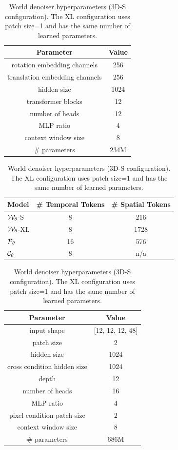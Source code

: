 \begin{subappendices}
\begin{table}[htbp]
\begin{minipage}[t]{0.48\textwidth}
\vspace{0.8em}

\caption{Camera model configuration.}
\label{c4:table:cam-model}
\begin{tabular}{cc}\toprule
Parameter & Value \\
\midrule
rotation embedding channels & 256 \\
translation embedding channels & 256 \\
hidden size & 1024 \\
transformer blocks & 12 \\
number of heads & 12 \\
MLP ratio & 4 \\
context window size & 8 \\
\# parameters & 234M \\
\bottomrule
\end{tabular}

\vspace{0.8em}

\caption{Number of spatial and temporal tokens for different models.}
\label{c4:table:tokens}
\begin{tabular}{lcc}
\toprule
Model & \# Temporal Tokens & \# Spatial Tokens \\
\midrule
${\mathcal{W}}_\theta$-S & 8 & 216 \\
${\mathcal{W}}_\theta$-XL & 8 & 1728 \\
${\mathcal{P}}_\theta$ & 16 & 576 \\
${\mathcal{C}}_\theta$ & 8 & n/a \\
\bottomrule
\end{tabular}

\end{minipage}
\hfill
\begin{minipage}[t]{0.48\textwidth}
\centering

\caption{World denoiser hyperparameters (3D-S configuration). The XL configuration uses patch size=1 and has the same number of learned parameters.}
\label{c4:table:world-denoiser}
\begin{tabular}{cc}\toprule
Parameter & Value \\
\midrule
input shape & [12, 12, 12, 48] \\
patch size & 2 \\
hidden size & 1024 \\
cross condition hidden size & 1024 \\
depth & 12 \\
number of heads & 16 \\
MLP ratio & 4 \\
pixel condition patch size & 2 \\
context window size & 8 \\
\# parameters & 686M \\
\bottomrule
\end{tabular}


\end{minipage}
\end{table}
\end{subappendices}
